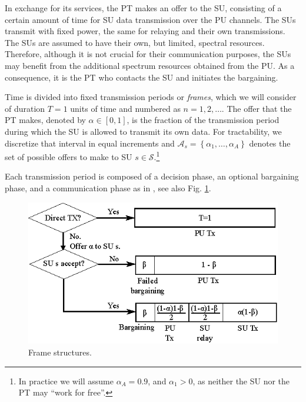 In exchange for its services, the PT makes an offer to the SU, consisting of a certain amount of time for SU data transmission over the PU channels. 
The SUs transmit with fixed power, the same for relaying and their own transmissions. 
The SUs are assumed to have their own, but limited, spectral resources. Therefore, although it is not crucial for their communication purposes, the SUs may benefit from the additional spectrum resources obtained from the PU.
As a consequence, it is the PT who contacts the SU and initiates the bargaining.

Time is divided into fixed transmission periods or \textit{frames}, which we will consider of duration $T = 1$ units of time and numbered as $n=1,2,\ldots$. 
The offer that the PT makes, denoted by $\alpha \in [0,1]$, is the fraction of the transmission period during which the SU is allowed to transmit its own data.
For tractability, we discretize that interval in equal increments and $\mathcal{A}_s = \left\{\alpha_{1},\ldots,\alpha_{A}\right\}$ denotes the set of possible offers to make to SU $s \in \mathcal{S}$.\footnote{In practice we will assume $\alpha_A = 0.9$, and $\alpha_1>0$, as neither the SU nor the PT may ``work for free''.} 

Each transmission period is composed of a decision phase, an optional bargaining phase, and a communication phase as in \cite{ref:Simeone2008,ref:Yan2013}, see also Fig. \ref{fig:phase}. 

\begin{figure}[!t]
\centering
\includegraphics{phase.eps}
\caption{Frame structures.}
\label{fig:phase}
\end{figure}

